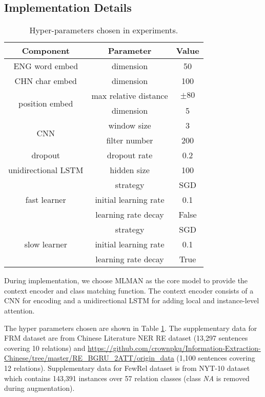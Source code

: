 \subsection{Implementation Details}
\begin{table}[h]
\centering
\small
\begin{tabular}{|c|c|c|}
\hline
\textbf{Component} & \textbf{Parameter} & \textbf{Value} \\ \hline
ENG word embed & dimension & 50 \\ \hline
CHN char embed & dimension & 100 \\ \hline
\multirow{2}{*}{position embed} & max relative distance & $\pm80$ \\ \cline{2-3}
& dimension & 5 \\ \hline
\multirow{2}{*}{CNN} & window size & 3 \\ \cline{2-3}
& filter number & 200 \\ \hline
dropout & dropout rate & 0.2 \\ \hline
unidirectional LSTM & hidden size & 100 \\ \hline
\multirow{3}{*}{fast learner} & strategy & SGD \\ \cline{2-3}
& initial learning rate & 0.1 \\ \cline{2-3}
& learning rate decay & False \\ \hline
\multirow{3}{*}{slow learner} & strategy & SGD \\ \cline{2-3}
& initial learning rate & 0.1 \\ \cline{2-3}
& learning rate decay & True \\ \hline
\end{tabular}
\caption{Hyper-parameters chosen in experiments.}
\label{hyper}
\end{table}
During implementation, we choose MLMAN\citep{ye-ling-2019-multi} as the core model to provide the context encoder and class matching function. The context encoder consists of a CNN for encoding and a unidirectional LSTM for adding local and instance-level attention.

The hyper parameters chosen are shown in Table \ref{hyper}. The supplementary data for FRM dataset are from Chinese Literature NER RE dataset \citep{dnerre} (13,297 sentences covering 10 relations) and \url{https://github.com/crownpku/Information-Extraction-Chinese/tree/master/RE_BGRU_2ATT/origin_data} (1,100 sentences covering 12 relations). Supplementary data for FewRel dataset is from NYT-10 dataset \citep{NYTdataset} which contains 143,391 instances over 57 relation classes (class \emph{NA} is removed during augmentation).

